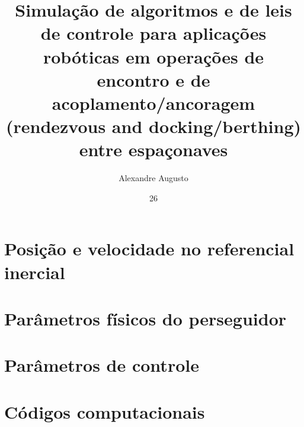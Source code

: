 \documentclass[msc]{ita}
\author{Alexandre Augusto}{Santana de Oliveira}
\title{Simulação de algoritmos e de leis de controle para aplicações robóticas em operações de encontro e de acoplamento/ancoragem (rendezvous and docking/berthing) entre espaçonaves}
\date{26}{fevereiro}{2026}
\begin{document}
% 

\mainmatter


















\renewcommand\bibname{\itareferencesnamebabel} %
\printbibliography

\appendix
\chapter{Posição e velocidade no referencial inercial}
% 

\chapter{Parâmetros físicos do perseguidor}
% 

\chapter{Parâmetros de controle}
% 

\chapter{Códigos computacionais}
% 

\annex


\end{document}

